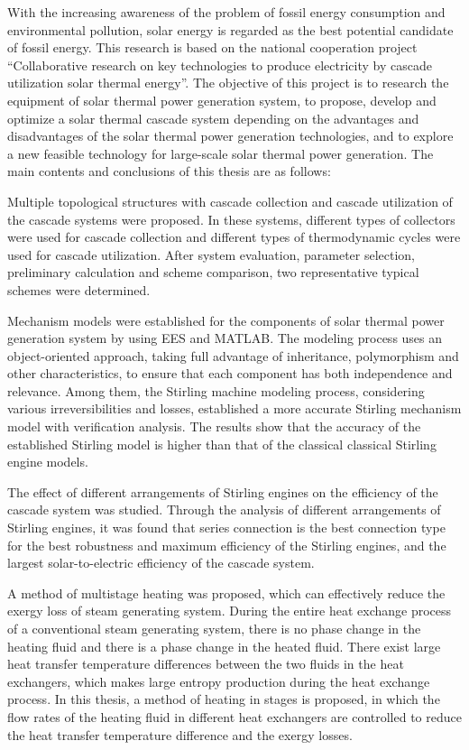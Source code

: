 \enabstract
{
With the increasing awareness of the problem of fossil energy consumption and environmental pollution, solar energy is regarded as the best potential candidate of fossil energy. This research is based on the national cooperation project ``Collaborative research on key technologies to produce electricity by cascade utilization solar thermal energy''. The objective of this project is to research the equipment of solar thermal power generation system, to propose, develop and optimize a solar thermal cascade system depending on the advantages and disadvantages of the solar thermal power generation technologies, and to explore a new feasible technology for large-scale solar thermal power generation. The main contents and conclusions of this thesis are as follows:

Multiple topological structures with cascade collection and cascade utilization of the cascade systems were proposed. In these systems, different types of collectors were used for cascade collection and different types of thermodynamic cycles were used for cascade utilization. After system evaluation, parameter selection, preliminary calculation and scheme comparison, two representative typical schemes were determined.

Mechanism models were established for the components of solar thermal power generation system by using EES and MATLAB. The modeling process uses an object-oriented approach, taking full advantage of inheritance, polymorphism and other characteristics, to ensure that each component has both independence and relevance. Among them, the Stirling machine modeling process, considering various irreversibilities and losses, established a more accurate Stirling mechanism model with verification analysis. The results show that the accuracy of the established Stirling model is higher than that of the classical classical Stirling engine models.

The effect of different arrangements of Stirling engines on the efficiency of the cascade system was studied. Through the analysis of different arrangements of Stirling engines, it was found that series connection is the best connection type for the best robustness and maximum efficiency of the Stirling engines, and the largest solar-to-electric efficiency of the cascade system.

A method of multistage heating was proposed, which can effectively reduce the exergy loss of steam generating system. During the entire heat exchange process of a conventional steam generating system, there is no phase change in the heating fluid and there is a phase change in the heated fluid. There exist large heat transfer temperature differences between the two fluids in the heat exchangers, which makes large entropy production during the heat exchange process. In this thesis, a method of heating in stages is proposed, in which the flow rates of the heating fluid in different heat exchangers are controlled to reduce the heat transfer temperature difference and the exergy losses. 

}

